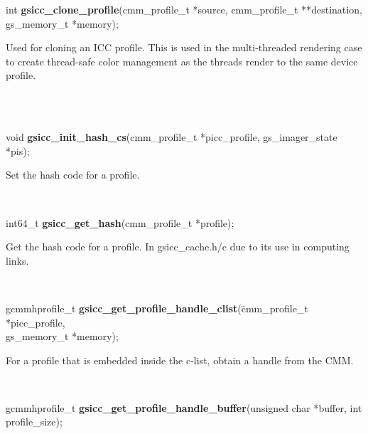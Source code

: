 \documentclass[12pt,notitlepage]{article}
\begin{document}
\begin{tabbing}
\noindent int {\bf gsicc\_clone\_profile}(cmm\_profile\_t *source, cmm\_profile\_t **destination, gs\_memory\_t *memory);\\
\end{tabbing}

\begin{minipage}[h]{6.0in}
Used for cloning an ICC profile.  This is used in the multi-threaded rendering case to create thread-safe color management as the threads render to the same device profile.
\end{minipage}\\
\\

\begin{tabbing}
\noindent void {\bf gsicc\_init\_hash\_cs}(cmm\_profile\_t *picc\_profile, gs\_imager\_state *pis);\\
\end{tabbing}

\begin{minipage}[h]{6.0in}
Set the hash code for a profile.
\end{minipage}\\

\begin{tabbing}
\noindent int64\_t {\bf gsicc\_get\_hash}(cmm\_profile\_t *profile);\\
\end{tabbing}

\begin{minipage}[h]{6.0in}
Get the hash code for a profile.  In gsicc\_cache.h/c due to its use in computing links.
\end{minipage}\\

\begin{tabbing}
\noindent gcmmhprofile\_t {\bf gsicc\_get\_profile\_handle\_clist}(\=cmm\_profile\_t *picc\_profile, \\
\>gs\_memory\_t *memory);\\
\end{tabbing}

\begin{minipage}[h]{6.0in}
For a profile that is embedded inside the c-list, obtain a handle from the CMM.
\end{minipage}\\

\begin{tabbing}
\noindent gcmmhprofile\_t {\bf gsicc\_get\_profile\_handle\_buffer}(unsigned char *buffer, int profile\_size);\\
\end{tabbing}
\end{document}
